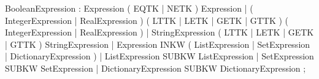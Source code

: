 %
%
%
\begin{rail}
BooleanExpression : Expression ( EQTK | NETK ) Expression
                  | ( IntegerExpression | RealExpression )
                    ( LTTK | LETK | GETK | GTTK )
                    ( IntegerExpression | RealExpression )
                  | StringExpression ( LTTK | LETK | GETK | GTTK )
                    StringExpression
                  | Expression INKW ( ListExpression | SetExpression
                                    | DictionaryExpression )
                  | ListExpression SUBKW ListExpression
                  | SetExpression SUBKW SetExpression
                  | DictionaryExpression SUBKW DictionaryExpression
                  ;
\end{rail}
